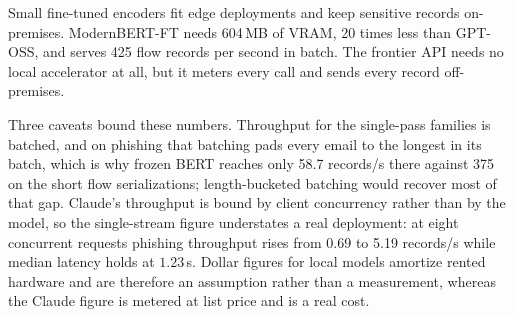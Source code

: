 \documentclass{jmlr}
\begin{document}
Small fine-tuned encoders fit edge deployments and keep sensitive records on-premises. ModernBERT-FT needs 604\,MB of VRAM, 20 times less than GPT-OSS, and serves 425 flow records per second in batch. The frontier API needs no local accelerator at all, but it meters every call and sends every record off-premises.

Three caveats bound these numbers. Throughput for the single-pass families is batched, and on phishing that batching pads every email to the longest in its batch, which is why frozen BERT reaches only 58.7 records/s there against 375 on the short flow serializations; length-bucketed batching would recover most of that gap. Claude's throughput is bound by client concurrency rather than by the model, so the single-stream figure understates a real deployment: at eight concurrent requests phishing throughput rises from 0.69 to 5.19 records/s while median latency holds at $1.23$\,s. Dollar figures for local models amortize rented hardware and are therefore an assumption rather than a measurement, whereas the Claude figure is metered at list price and is a real cost.
\end{document}
